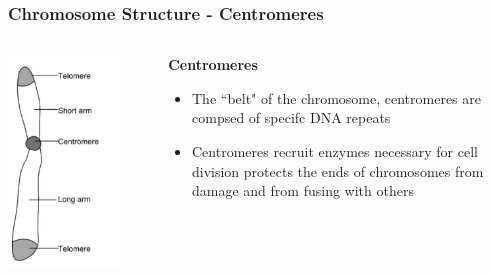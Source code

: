 \documentclass{beamer}
\begin{document}
	\begin{frame}
	\frametitle{Chromosome Structure - Centromeres}
	\begin{columns}
		\begin{column}{0.5\textwidth}
			
			\centering	\includegraphics[keepaspectratio, width  =0.8\textwidth]{img/chromosomeDiagram}
		\end{column}
		\begin{column}{0.5\textwidth}
			\textbf{Centromeres}
			\begin{itemize}
				\item The ``belt" of the chromosome, centromeres are compsed of specifc DNA repeats 
				\vspace{20pt}
				\item Centromeres recruit enzymes necessary for cell division
				protects the ends of chromosomes from damage and from fusing with others
				\vspace{10pt}

			\end{itemize}
		\end{column}
		
	\end{columns}
\end{frame}
\end{document}
